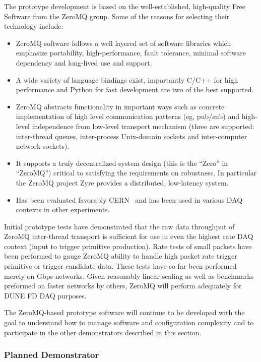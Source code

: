 The prototype development is based on the well-established, high-quality Free Software from the ZeroMQ group.
Some of the reasons for selecting their technology include:
\begin{itemize}
\item ZeroMQ software follows a well layered set of software libraries which emphasize portability, high-performance, fault tolerance, minimal software dependency and long-lived use and support.
\item A wide variety of language bindings exist, importantly C/C++ for high performance and Python for fast development are two of the best supported.
\item ZeroMQ abstracts functionality in important ways such as concrete implementation of high level communication patterns (eg, pub/sub) and high-level independence from low-level transport mechanism (three are supported: inter-thread queues, inter-process Unix-domain sockets and inter-computer network sockets). 
\item It supports a truly decentralized system design (this is the ``Zero'' in ``ZeroMQ'') critical to satisfying the requirements on robustness.  In particular the ZeroMQ project Zyre provides a distributed, low-latency  system.
\item Has been evaluated favorably CERN~\cite{Dworak:2012mf} and has been used in various DAQ contexts in other experiments.
\end{itemize}

Initial prototype tests have demonstrated that the raw data throughput of ZeroMQ inter-thread transport is sufficient for use in even the highest rate DAQ context (input to trigger primitive production).
Rate tests of small packets have been performed to gauge ZeroMQ ability to handle high packet rate trigger primitive or trigger candidate data. 
These tests have so far been performed merely on Gbps networks. 
Given reasonably linear scaling as well as benchmarks preformed on faster networks by others, ZeroMQ will perform adequately for DUNE FD DAQ purposes.

The ZeroMQ-based prototype software will continue to be developed with the goal to understand how to manage software and configuration complexity and to participate in the other demonstrators described in this section. 


\subsubsection{Planned   Demonstrator}
\label{sec:sp-daq:validation-pd-demonstrator}

